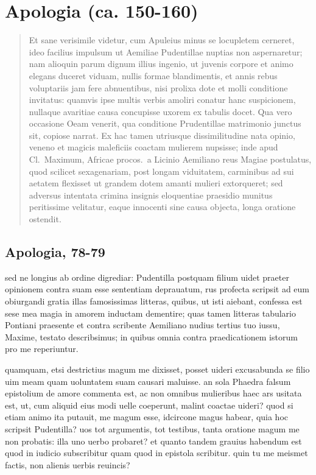 \section*{Apologia (ca. 150-160)}
\begin{quotation}
\noindent Et sane verisimile videtur, cum Apuleius minus se locupletem cerneret, ideo facilius impulsum ut Aemiliae Pudentillae nuptias non aspernaretur; nam alioquin parum dignum illius ingenio, ut juvenis corpore et animo elegans duceret viduam, nullis formae blandimentis, et annis rebus voluptariis jam fere abnuentibus, nisi prolixa dote et molli conditione invitatus: quamvis ipse multis verbis amoliri conatur hanc suspicionem, nullaque avaritiae causa concupisse uxorem ex tabulis docet. Qua vero occasione Oeam venerit, qua conditione Prudentillae matrimonio junctus sit, copiose narrat. Ex hac tamen utriusque dissimilitudine nata opinio, veneno et magicis maleficiis coactam mulierem nupsisse; inde apud Cl.\ Maximum, Africae procos.\ a Licinio Aemiliano reus Magiae postulatus, quod scilicet sexagenariam, post longam viduitatem, carminibus ad sui aetatem flexisset ut grandem dotem amanti mulieri extorqueret; sed adversus intentata crimina insignis eloquentiae praesidio munitus peritissime velitatur, eaque innocenti sine causa objecta, longa oratione ostendit.
\end{quotation}

\subsection*{Apologia, 78-79}

sed ne longius ab ordine digrediar: Pudentilla postquam filium uidet praeter opinionem contra suam esse sententiam deprauatum, rus profecta scripsit ad eum obiurgandi gratia illas famosissimas litteras, quibus, ut isti aiebant, confessa est sese mea magia in amorem inductam dementire; quas tamen litteras tabulario Pontiani praesente et contra scribente Aemiliano nudius tertius tuo iussu, Maxime, testato describsimus; in quibus omnia contra praedicationem istorum pro me reperiuntur. 

quamquam, etsi destrictius magum me dixisset, posset uideri excusabunda se filio uim meam quam uoluntatem suam causari maluisse. an sola Phaedra falsum epistolium de amore commenta est, ac non omnibus mulieribus haec ars usitata est, ut, cum aliquid eius modi uelle coeperunt, malint coactae uideri? quod si etiam animo ita putauit, me magum esse, idcircone magus habear, quia hoc scripsit Pudentilla? uos tot argumentis, tot testibus, tanta oratione magum me non probatis: illa uno uerbo probaret? et quanto tandem grauius habendum est quod in iudicio subscribitur quam quod in epistola scribitur. quin tu me meismet factis, non alienis uerbis reuincis? 

